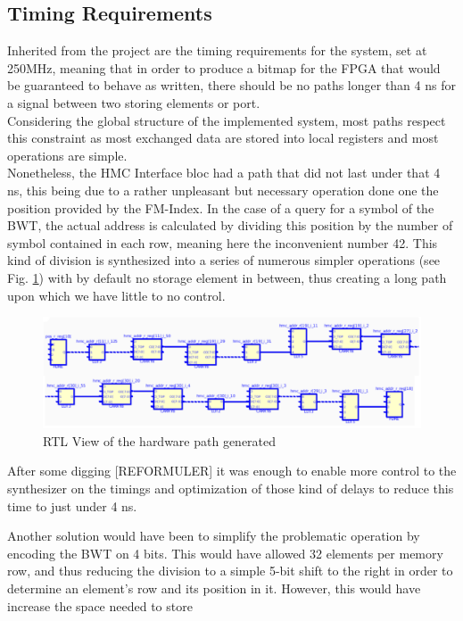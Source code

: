 \subsection{Timing Requirements}

Inherited from the project are the timing requirements for the system, set at 250MHz, meaning that in order to produce a bitmap for the FPGA that would be guaranteed to behave as written, there should be no paths longer than 4 ns for a signal between two storing elements or port. \\
Considering the global structure of the implemented system, most paths respect this constraint as most exchanged data are stored into local registers and most operations are simple.\\

Nonetheless, the HMC Interface bloc had a path that did not last under that 4 ns, this being due to a rather unpleasant but necessary operation done one the position provided by the FM-Index. In the case of a query for a symbol of the BWT, the actual address is calculated by dividing this position by the number of symbol contained in each row, meaning here the inconvenient number 42. This kind of division is synthesized into a series of numerous simpler operations (see Fig. \ref{fig:timing}) with by default no storage element in between, thus creating a long path upon which we have little to no control. \\

\begin{figure}[H]
    \centering
    \hspace*{-3mm}\includegraphics[scale = 0.4]{Figures/TIMING_RTL.png}
    \caption{RTL View of the hardware path generated}
    \label{fig:timing}
\end{figure}

After some digging [REFORMULER] it was enough to enable more control to the synthesizer on the timings and optimization of those kind of delays to reduce this time to just under 4 ns. 

Another solution would have been to simplify the problematic operation by encoding the BWT on 4 bits. This would have allowed 32 elements per memory row, and thus reducing the division to a simple 5-bit shift to the right in order to determine an element's row and its position in it. However, this would have increase the space needed to store 

